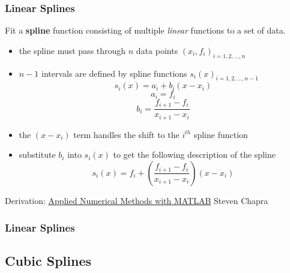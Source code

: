 \documentclass[fleqn]{beamer} %
\newcommand{\sectionIIIsubsectionIIItitle}{Linear Splines}
\newcommand{\sectionIIIsubsectionIVtitle}{Cubic Splines}
\begin{document}
			\begin{frame}
				\frametitle{\sectionIIIsubsectionIIItitle}
				\bigskip
        
        Fit a {\bf spline} function consisting of multiple {\it linear} functions to a set of data. \\
        
        \begin{itemize}
          \item the spline must pass through $n$ data points $\left(x_i,f_i \right)_{i=1,2,...,n}$
          \item $n-1$ intervals are defined by spline functions $s_i(x)_{i=1,2,...,n-1}$
          \[s_i\left(x\right)=a_i+b_i(x-x_i) \]
          \[a_i=f_i\] \[b_i=\frac{f_{i+1}-f_i}{x_{i+1}-x_i}\]
          \item the $(x-x_i)$ term handles the shift to the $i^{th}$ spline function
          \item substitute $b_i$ into $s_i(x)$ to get the following description of the spline
          \[s_i\left(x\right)=f_i+\left(\frac{f_{i+1}-f_i}{x_{i+1}-x_i}\right)\left(x-x_i\right) \]
        \end{itemize}

				\btVFill
        \tiny{Derivation: \underline{Applied Numerical Methods with MATLAB} Steven Chapra}
			
    \end{frame}

		\begin{frame}
				\frametitle{\sectionIIIsubsectionIIItitle}
				\bigskip
        
			
    \end{frame}
		\subsection{\sectionIIIsubsectionIVtitle}\label{sectionIIIsubsectionIV}
\end{document}
